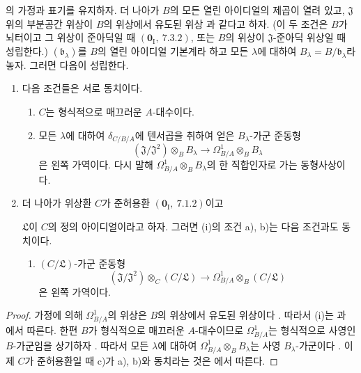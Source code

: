 \begin{corollary}[22.6.2]
\label{0.22.6.2-ko}
의 가정과 표기를 유지하자. 더 나아가 $B$의 모든
열린 아이디얼의 제곱이 열려 있고, $\mathfrak J$ 위의 부분공간 위상이
$B$의 위상에서 유도된 위상 과 같다고 하자. (이 두
조건은 $B$가 뇌터이고 그 위상이 준아딕일 때
$(\mathbf 0_{\mathrm I},~7.3.2)$, 또는 $B$의 위상이
$\mathfrak J$-준아딕 위상일 때 성립한다.)
$(\mathfrak b_\lambda)$를 $B$의 열린 아이디얼 기본계라 하고 모든
$\lambda$에 대하여 $B_\lambda=B/\mathfrak b_\lambda$라 놓자. 그러면
다음이 성립한다.
\begin{enumerate}
  \item[\rm(i)] 다음 조건들은 서로 동치이다.
  \begin{enumerate}
    \item[a)] $C$는 형식적으로 매끄러운 $A$-대수이다.
    \item[b)] 모든 $\lambda$에 대하여 $\delta_{C/B/A}$에 텐서곱을
    취하여 얻은 $B_\lambda$-가군 준동형
    \begin{equation}
    \label{0.22.6.2.1-ko}
      (\mathfrak J/\mathfrak J^2)\otimes_BB_\lambda
      \longrightarrow\Omega^1_{B/A}\otimes_BB_\lambda
      \tag{22.6.2.1}
    \end{equation}
    은 왼쪽 가역이다. 다시 말해
    $\Omega^1_{B/A}\otimes_BB_\lambda$의 한 직합인자로 가는
    동형사상이다.
  \end{enumerate}
  \item[\rm(ii)] 더 나아가 위상환 $C$가 준허용환
  $(\mathbf 0_{\mathrm I},~7.1.2)$이고


  $\mathfrak L$이 $C$의 정의 아이디얼이라고 하자. 그러면 (i)의 조건
  a), b)는 다음 조건과도 동치이다.
  \begin{enumerate}
    \item[c)] $(C/\mathfrak L)$-가군 준동형
    \[
      (\mathfrak J/\mathfrak J^2)\otimes_C(C/\mathfrak L)
      \longrightarrow\Omega^1_{B/A}\otimes_B(C/\mathfrak L)
    \]
    은 왼쪽 가역이다.
  \end{enumerate}
\end{enumerate}
\end{corollary}

\begin{proof}
가정에 의해 $\Omega^1_{B/A}$의 위상은 $B$의 위상에서 유도된 위상이다
. 따라서 (i)는 과
에서 따른다. 한편 $B$가 형식적으로 매끄러운
$A$-대수이므로 $\Omega^1_{B/A}$는 형식적으로 사영인 $B$-가군임을
상기하자 . 따라서 모든 $\lambda$에 대하여
$\Omega^1_{B/A}\otimes_BB_\lambda$는 사영 $B_\lambda$-가군이다
. 이제 $C$가 준허용환일 때 c)가 a), b)와 동치라는
것은 에서 따른다.
\end{proof}

